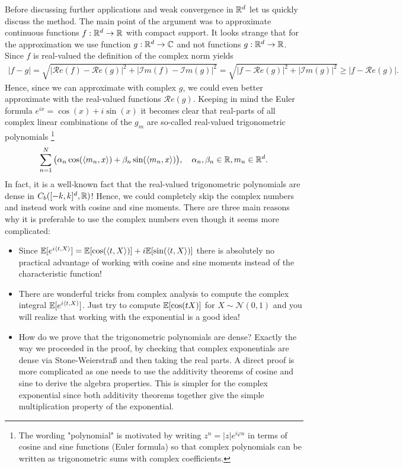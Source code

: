 Before discussing further applications and weak convergence in $\mathbb{R}^d$ let us quickly discuss the method. The main point of the argument was to approximate continuous functions $f:\mathbb{R}^d\to \mathbb{R}$ with compact support. It looks strange that for the approximation we use function $g:\mathbb{R}^d\to \mathbb{C}$ and not functions $g:\mathbb{R}^d\to \mathbb{R}$.  Since $f$ is real-valued the definition of the complex norm yields
\begin{align*}
	|f-g|=\sqrt{|\mathcal R e(f)-\mathcal R e(g)|^2+|\mathcal I m(f)-\mathcal I m(g)|^2}=\sqrt{|f-\mathcal R e (g)|^2+|\mathcal I m(g)|^2}\geq |f-\mathcal R e(g)|.
\end{align*}
Hence, since we can approximate with complex $g$, we could even better approximate with the real-valued functions $\mathcal R e (g)$. Keeping in mind the Euler formula $e^{ix}=\cos(x)+i\sin(x)$ it becomes clear that real-parts of all complex linear combinations of the $g_m$ are  so-called real-valued trigonometric polynomials \footnote{The wording "{}polynomial"{} is motivated by writing  $z^n=|z|e^{i\varphi n}$ in terms of cosine and sine functions (Euler formula) so that complex polynomials can be written as trigonometric sums with complex coefficients.}
\begin{align*}
	\sum_{n=1}^N \big(\alpha_n \cos(\langle m_n, x \rangle)+\beta_n\sin(\langle m_n, x \rangle)\big),\quad \alpha_n,\beta_n\in \mathbb{R}, m_n\in \mathbb{R}^d.
\end{align*}
In fact, it is a well-known fact that the real-valued trigonometric polynomials are dense in $C_b([-k,k]^d,\mathbb{R})$! Hence, we could completely skip the complex numbers and instead work with cosine and sine moments. There are three main reasons why it is preferable to use the complex numbers even though it seems more complicated:
\begin{itemize}
	\item Since $\mathbb{E}[e^{i\langle t,X\rangle}]=\mathbb{E}[\cos(\langle t,X\rangle)]+i\mathbb{E}[\sin(\langle t,X\rangle)]$ there is absolutely no practical advantage of working with cosine and sine moments instead of the characteristic function!
	\item There are wonderful tricks from complex analysis to compute the complex integral $\mathbb{E}[e^{i\langle t,X\rangle}]$. Just try to compute $\mathbb{E}[\cos(tX)]$ for $X\sim \mathcal N(0,1)$ and you will realize that working with the exponential is a good idea!
	\item How do we prove that the trigonometric polynomials are dense? Exactly the way we proceeded in the proof, by checking that complex exponentials are dense via Stone-Weierstra\ss{} and then taking the real parts. A direct proof is more  complicated as one needs to use the additivity theorems of cosine and sine to derive the algebra properties. This is simpler for the complex exponential since both additivity theorems together give the simple multiplication property of the exponential.
\end{itemize}




